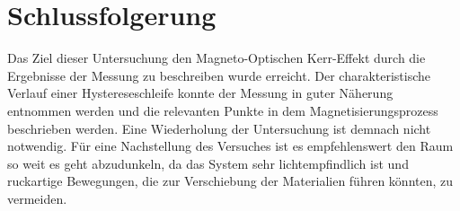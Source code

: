 \section{Schlussfolgerung}

	Das Ziel dieser Untersuchung den Magneto-Optischen Kerr-Effekt durch die Ergebnisse der Messung zu beschreiben wurde erreicht.
	Der charakteristische Verlauf einer Hystereseschleife konnte der Messung in guter Näherung entnommen werden und die relevanten Punkte in dem Magnetisierungsprozess beschrieben werden.
	Eine Wiederholung der Untersuchung ist demnach nicht notwendig.
	Für eine Nachstellung des Versuches ist es empfehlenswert den Raum so weit es geht abzudunkeln, da das System sehr lichtempfindlich ist und ruckartige Bewegungen, die zur Verschiebung der Materialien führen könnten, zu vermeiden.